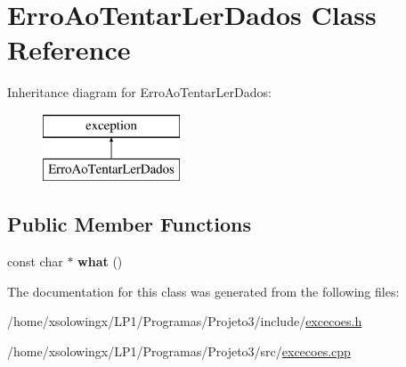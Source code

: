 \hypertarget{classErroAoTentarLerDados}{}\section{Erro\+Ao\+Tentar\+Ler\+Dados Class Reference}
\label{classErroAoTentarLerDados}
Inheritance diagram for Erro\+Ao\+Tentar\+Ler\+Dados\+:\begin{figure}[H]
\begin{center}
\leavevmode
\includegraphics[height=2.000000cm]{classErroAoTentarLerDados}
\end{center}
\end{figure}
\subsection*{Public Member Functions}
\begin{DoxyCompactItemize}
\item 
\mbox{\label{classErroAoTentarLerDados_a0a0b41c84affe6dbdc4b7f06bb542099}} 
const char $\ast$ {\bfseries what} ()
\end{DoxyCompactItemize}


The documentation for this class was generated from the following files\+:\begin{DoxyCompactItemize}
\item 
/home/xsolowingx/\+L\+P1/\+Programas/\+Projeto3/include/\hyperlink{excecoes_8h}{excecoes.\+h}\item 
/home/xsolowingx/\+L\+P1/\+Programas/\+Projeto3/src/\hyperlink{excecoes_8cpp}{excecoes.\+cpp}\end{DoxyCompactItemize}

